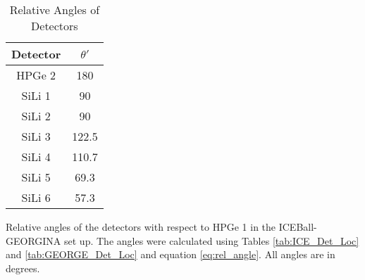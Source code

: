\begin{table}[]
    \centering
    \caption{Relative Angles of Detectors}
    \begin{tabular}{c|c} \toprule
         Detector & $\theta '$  \\
         \hline 
         HPGe 2 & 180 \\
         SiLi 1 & 90\\
         SiLi 2 & 90\\
         SiLi 3 & 122.5\\
         SiLi 4 & 110.7\\
         SiLi 5 & 69.3 \\
         SiLi 6 & 57.3 \\ \bottomrule
    \end{tabular}
    \footnotesize
    \item Relative angles of the detectors with respect to HPGe 1 in the ICEBall-GEORGINA set up. The angles were calculated using Tables \ref{tab:ICE_Det_Loc} and \ref{tab:GEORGE_Det_Loc} and equation \ref{eq:rel_angle}. All angles are in degrees.
    \label{tab:rel_angle_g}
\end{table}